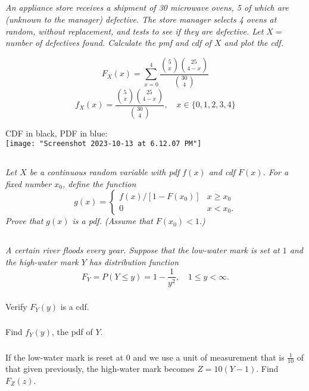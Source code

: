 \documentclass[12pt]{amsart}
\begin{document}
\setcounter{subsection}{50}
\subsection{} %
\textit{An appliance store receives a shipment of 30 microwave ovens, 5 of which are (unknown
	to the manager) defective. The store manager selects 4 ovens at random, without
	replacement, and tests to see if they are defective. Let \(X =\) number of defectives
	found. Calculate the pmf and cdf of \(X\) and plot the cdf.}

	\[ F_X(x) = \sum_{x=0}^{4} \frac{\binom{5}{x}\binom{25}{4-x}}{\binom{30}{4}} \]
	\[ f_X(x) = \frac{\binom{5}{x}\binom{25}{4-x}}{\binom{30}{4}}, \quad x\in\{0,1,2,3,4\} \]

	CDF in black, PDF in blue:\\
	\texttt{[image: "Screenshot 2023-10-13 at 6.12.07 PM"]}



\subsection{} %
\textit{Let \(X\) be a continuous random variable with pdf \(f(x)\) and cdf \(F(x)\). For a fixed number \(x_0\), define the function
	\[g(x) = \begin{cases}
		f(x)/[1 − F(x_0)] & x\geq x_0 \\
		0 & x < x_0.
	\end{cases} \]
	Prove that \(g(x)\) is a pdf. (Assume that \(F(x_0) < 1\).)}


\subsection{} %
\textit{A certain river floods every year. Suppose that the low-water mark is set at \(1\) and the
	high-water mark \(Y\) has distribution function}
	\[ F_Y = P(Y\leq y) = 1-\frac{1}{y^2}, \quad 1\leq y<\infty. \]
	\subsubsection{} Verify \(F_Y(y)\) is a cdf.
	
	\subsubsection{} Find \(f_Y(y)\), the pdf of \(Y\).
	
	\subsubsection{} If the low-water mark is reset at \(0\) and we use a unit of measurement that is $\frac{1}{10}$ of
		that given previously, the high-water mark becomes \(Z = 10(Y − 1)\). Find \(F_Z(z)\).
		
\end{document}

